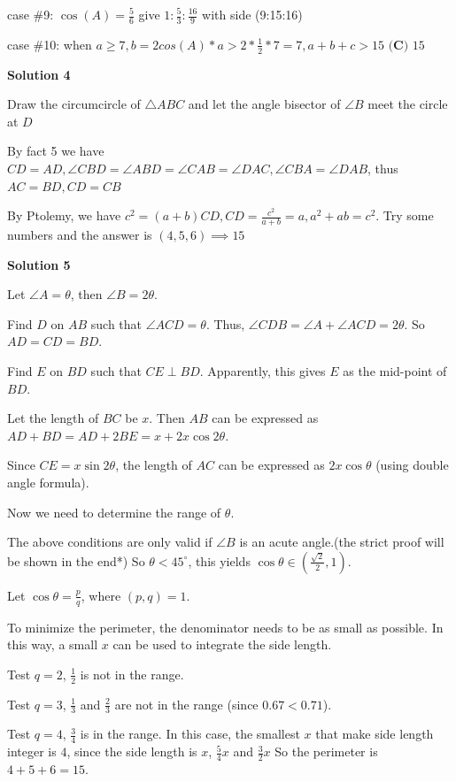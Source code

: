 \begin{enumerate}
 case \#9: $\cos(A) = \frac{5}{6}$ give ${1: \frac{5}{3} :  \frac{16}{9}  }$ with side (9:15:16) 

 case \#10: when $a \geq 7, b =2cos(A)*a > 2*  \frac{1}{2}*7 = 7 , a+b+c > 15$
$\boxed{\textbf{(C) }15}$




\textbf{Solution 4}

Draw the circumcircle of $\triangle{ABC}$ and let the angle bisector of $\angle{B}$ meet the circle at $D$

 By fact 5 we have $CD=AD, \angle{CBD}=\angle{ABD}=\angle{CAB}=\angle{DAC}, \angle{CBA}=\angle{DAB}$, thus $AC=BD, CD=CB$

 By Ptolemy, we have $c^2=(a+b)CD, CD=\frac{c^2}{a+b}=a, a^2+ab=c^2$. Try some numbers and the answer is $(4,5,6)\implies \boxed{15}$




\textbf{Solution 5}

Let $\angle A=\theta$, then $\angle B=2\theta$.

 Find $D$ on $AB$ such that $\angle ACD=\theta$. Thus, $\angle CDB=\angle A+\angle ACD=2\theta$. So $AD=CD=BD$.

 Find $E$ on $BD$ such that $CE\perp BD$. Apparently, this gives $E$ as the mid-point of $BD$.

 Let the length of $BC$ be $x$. Then $AB$ can be expressed as $AD+BD=AD+2BE=x+2x\cos 2\theta$.

 Since $CE=x\sin 2\theta$, the length of $AC$ can be expressed as $2x\cos\theta$ (using double angle formula).

 Now we need to determine the range of $\theta$.

 The above conditions are only valid if $\angle B$ is an acute angle.(the strict proof will be shown in the end*) So $\theta<45^\circ$, this yields $\cos\theta\in\left(\frac{\sqrt{2}}{2},1\right)$.

 Let $\cos\theta=\frac{p}{q}$, where $(p,q)=1$.

 To minimize the perimeter, the denominator needs to be as small as possible. In this way, a small $x$ can be used to integrate the side length.

 Test $q=2$, $\frac{1}{2}$ is not in the range.

 Test $q=3$, $\frac{1}{3}$ and $\frac{2}{3}$ are not in the range (since $0.67<0.71$).

 Test $q=4$, $\frac{3}{4}$ is in the range. In this case, the smallest $x$ that make side length integer is $4$, since the side length is $x$, $\frac{5}{4}x$ and $\frac{3}{2}x$ So the perimeter is $4+5+6=15$.


\end{enumerate}

